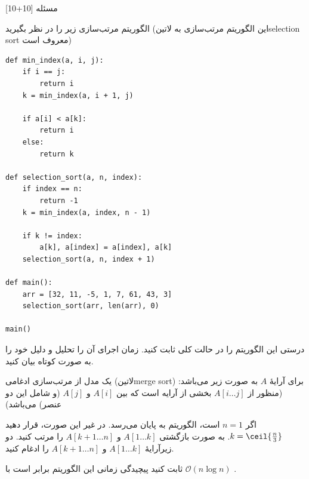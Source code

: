 ‌مسئله [10+10]


 الگوریتم مرتب‌سازی زیر را  در نظر بگیرید (این الگوریتم مرتب‌سازی به ‌لاتین{selection sort} معروف است)

\begin{latin}
\begin{lstlisting}
def min_index(a, i, j):
	if i == j:
		return i
	k = min_index(a, i + 1, j)

	if a[i] < a[k]:
		return i
	else:
		return k

def selection_sort(a, n, index):
	if index == n:
		return -1
	k = min_index(a, index, n - 1)

	if k != index:
		a[k], a[index] = a[index], a[k]
	selection_sort(a, n, index + 1)

def main():
	arr = [32, 11, -5, 1, 7, 61, 43, 3]
	selection_sort(arr, len(arr), 0)
	
main()
\end{lstlisting}
\end{latin}


 درستی این الگوریتم را در حالت کلی ثابت کنید. 
 زمان اجرای آن را تحلیل و دلیل خود را به صورت کوتاه بیان کنید.



یک مدل از مرتب‌سازی ادغامی (‌لاتین{merge sort}) برای آرایۀ $A$ به صورت زیر می‌باشد: (منظور از 
$A[i\dots j]$
بخشی از آرایه است که بین 
$A[i]$
و
$A[j]$
(و شامل این دو عنصر) می‌باشد)

 اگر 
$n=1$
است، الگوریتم به پایان می‌رسد.
 در غیر این صورت، قرار دهید
$k=\ceil{\frac{n}{3}}$.
 به صورت بازگشتی 
$A[1\dots k]$
و
$A[k+1\dots n]$
را مرتب کنید.
 دو زیرآرایۀ 
$A[1\dots k]$
و
$A[k+1\dots n]$
را ادغام کنید.


ثابت کنید پیچیدگی زمانی این الگوریتم برابر است با 
$\mathcal{O}(n\log{}n)$
.







